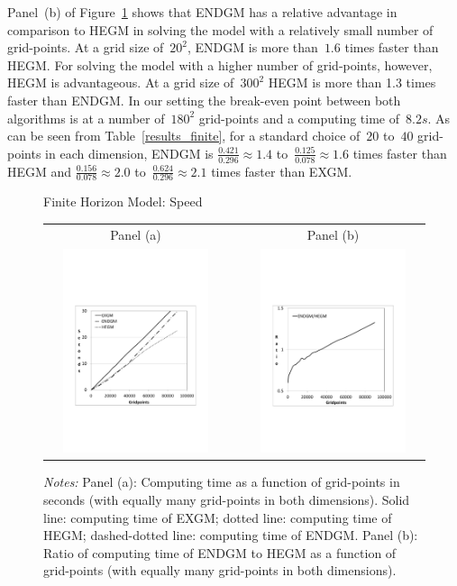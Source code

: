 \documentclass[a4paper,12pt]{article}
\begin{document}
Panel~(b) of Figure~\ref{graph_finte} shows that ENDGM has a relative advantage in comparison to HEGM in solving the model with a relatively small number of grid-points. At a grid size of~$20^{2}$, ENDGM is more than~$1.6$ times faster than HEGM. For solving the model with a higher number of grid-points, however, HEGM is advantageous. At a grid size of~$300^{2}$ HEGM is more than 1.3 times faster than ENDGM. In our setting the break-even point between both algorithms is at a number of~$180^{2}$ grid-points and a computing time of~$8.2s$. As can be seen from Table~\ref{results_finite}, for a standard choice of~$20$ to~$40$ grid-points in each dimension, ENDGM is $\frac{0.421} {0.296} \approx 1.4$ to~$\frac{0.125} {0.078} \approx 1.6$ times faster than HEGM and $\frac{0.156} {0.078} \approx 2.0$ to~$\frac{0.624} {0.296} \approx 2.1$ times faster than EXGM.
\begin{figure}[htbp]
	\caption{Finite Horizon Model: Speed}
	\label{graph_finte}
	\centering
	\begin{tabular}{cC{1cm}c}
	Panel (a) & & Panel (b)\\
	\includegraphics[height=6.0cm, width=6.0cm]{Abbildungen/Seconds_Finite.pdf} & & \includegraphics[height=6.0cm, width=6.0cm]{Abbildungen/Ratio_Finite.pdf} \\
	\end{tabular}
	\caption*{\footnotesize{\emph{Notes:} Panel (a): Computing time as a function of grid-points in seconds (with equally many grid-points in both dimensions). Solid line: computing time of EXGM; dotted line: computing time of HEGM; dashed-dotted line: computing time of ENDGM. Panel (b): Ratio of computing time of ENDGM to HEGM as a function of grid-points (with equally many grid-points in both dimensions).}}
\end{figure}
\end{document}
